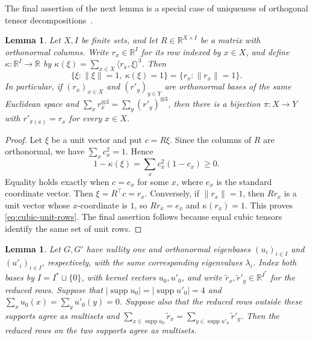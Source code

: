 \documentclass[11pt,a4paper]{article}
\theoremstyle{plain}
\newtheorem{lemma}[theorem]{Lemma}
\theoremstyle{definition}
\DeclareMathOperator{\supp}{supp}
\newcommand{\R}{\mathbb{R}}
\begin{document}
The final assertion of the next lemma is a special case of uniqueness of
orthogonal tensor decompositions~\cite[Theorem~3.2]{ZhangGolub2001}.
\begin{lemma}\label{lem:odeco}
 Let $X,I$ be finite sets, and let $R\in\R^{X\times I}$ be a matrix
 with orthonormal columns. Write $r_x\in\R^I$ for its row indexed by
 $x\in X$, and define $\kappa:\R^I\to\R$ by
 $\kappa(\xi)=\sum_{x\in X}\langle r_x,\xi\rangle^3$.
 Then
 \begin{equation}\label{eq:cubic-unit-rows}
  \{\xi:\lVert \xi\rVert=1,\ \kappa(\xi)=1\}
  =\{r_x:\lVert r_x\rVert=1\}.
 \end{equation}
 In particular, if $(r_x)_{x\in X}$ and $(r'_y)_{y\in Y}$ are
 orthonormal bases of the same Euclidean space and
 $\sum_x r_x^{\otimes3}=\sum_y(r'_y)^{\otimes3}$, then there is a
 bijection $\pi:X\to Y$ with $r'_{\pi(x)}=r_x$ for every $x\in X$.
\end{lemma}
\begin{proof}
 Let $\xi$ be a unit vector and put $c=R\xi$.
 Since the columns of $R$ are orthonormal, we have $\sum_xc_x^2=1$. Hence
 \begin{equation}\label{eq:cubic-unit-defect}
  1-\kappa(\xi)=\sum_x c_x^2(1-c_x)\geq0.
 \end{equation}
 Equality holds exactly when $c=e_x$ for some $x$,
 where $e_x$ is the standard coordinate vector.
 Then $\xi=R^{\top}c=r_x$.
 Conversely, if $\lVert r_x\rVert=1$, then $Rr_x$ is a unit vector
 whose $x$-coordinate is $1$, so $Rr_x=e_x$ and
 $\kappa(r_x)=1$. This proves \cref{eq:cubic-unit-rows}.
 The final assertion follows because equal cubic tensors identify the
 same set of unit rows.
\end{proof}
\begin{lemma}\label{lem:four-vertex-reconstruction}
Let $G,G'$ have nullity one and orthonormal eigenbases
$(u_i)_{i\in I}$ and $(u'_i)_{i\in I}$, respectively, with the same
corresponding eigenvalues $\lambda_i$.
Index both bases by $I=I^*\sqcup\{0\}$, with kernel vectors $u_0,u'_0$,
and write $\tilde{r}_x,\tilde{r}'_y\in\R^{I^*}$ for the reduced rows.
Suppose that $|\supp u_0|=|\supp u'_0|=4$ and
$\sum_xu_0(x)=\sum_yu'_0(y)=0$.
Suppose also that the reduced rows outside these supports agree as multisets and
$\sum_{x\in\supp u_0}\tilde{r}_x=\sum_{y\in\supp u'_0}\tilde{r}'_y$.
Then the reduced rows on the two supports agree as multisets.
\end{lemma}
\end{document}
